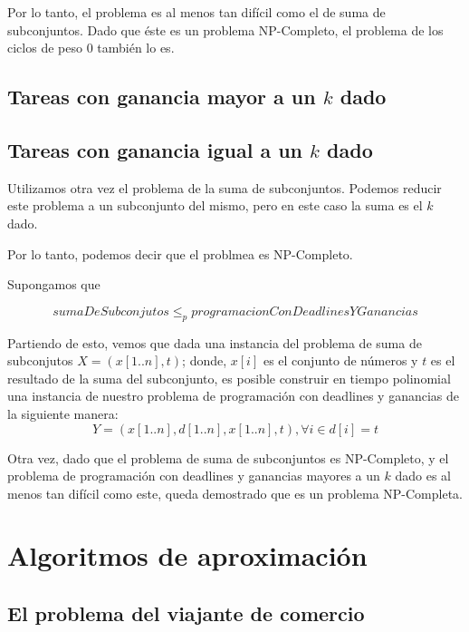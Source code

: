 \documentclass[a4paper,10pt]{article}
\begin{document}
\bigskip

Por lo tanto, el problema es al menos tan difícil como el de suma de subconjuntos. Dado que éste es un problema NP-Completo, el problema de los ciclos de peso 0 también lo es.

\subsection{Tareas con ganancia mayor a un \(k\) dado}

\subsection{Tareas con ganancia igual a un \(k\) dado}

Utilizamos otra vez el problema de la suma de subconjuntos. Podemos reducir este problema a un subconjunto del mismo, pero en este caso la suma es el \(k\) dado.

Por lo tanto, podemos decir que el problmea es NP-Completo.

Supongamos que

\[ sumaDeSubconjutos \le_{p} programacionConDeadlinesYGanancias \]

Partiendo de esto, vemos que dada una instancia del problema de suma de subconjutos \(X = (x[1..n], t)\); donde, \(x[i]\) es el conjunto de números y \(t\) es el resultado de la suma del subconjunto, es posible construir en tiempo polinomial una instancia de nuestro problema de programación con deadlines y ganancias de la siguiente manera: 
\[ Y = ( x[1..n], d[1..n], x[1..n], t ), \forall i \in d[i] = t \]

Otra vez, dado que el problema de suma de subconjuntos es NP-Completo, y el problema de programación con deadlines y ganancias mayores a un \(k\) dado es al menos tan difícil como este, queda demostrado que es un problema NP-Completa.

\section{Algoritmos de aproximación}

\subsection{El problema del viajante de comercio}
\end{document}
